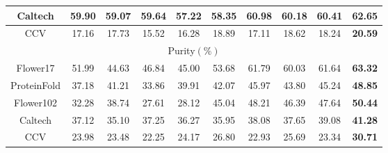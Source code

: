 \begin{frame}
\begin{itemize}
\begin{table}[!htbp]
\begin{center}
{{\begin{tabular}{|c|c|c|c|c|c|c|c|c|c|}
    \hline
    Caltech & 59.90  & 59.07  & 59.64  &57.22 & 58.35  & 60.98  & 60.18   & 60.41 & \textbf{\color{red}62.65}      \\
    \hline
    CCV     &17.16    &17.73   &15.52  &16.28 &18.89   &17.11   &18.62     & 18.24  &\textbf{\color{red} 20.59}   \\
    \midrule
    \multicolumn{10}{|c|}{Purity$(\%)$} \\
    \hline
    Flower17 & 51.99  & 44.63  & 46.84 &45.00 & 53.68  & 61.79  & 60.03  &  61.64 &  \textbf{\color{red}63.32}       \\
    \hline
    ProteinFold & 37.18  & 41.21  & 33.86 &39.91 & 42.07  & 45.97  & 43.80   & 45.24     &  \textbf{\color{red}48.85}  \\
    \hline
    Flower102 & 32.28  & 38.74  & 27.61 &28.12 & 45.04  & 48.21  & 46.39     & 47.64     &  \textbf{\color{red}50.44} \\
    \hline
    Caltech & 37.12  & 35.10  & 37.25  &36.27 & 35.95  & 38.08  & 37.65     & 39.08 & \textbf{\color{red}41.28}     \\
    \hline
    CCV     & 23.98  &23.48   &22.25  &24.17  &26.80   &22.93  &25.69      & 23.34  & \textbf{\color{red}30.71}    \\
    \bottomrule
    \end{tabular}}
    }
\end{center}
\end{table}
    \end{itemize}   
      
\end{frame}

